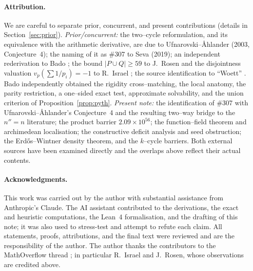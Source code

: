 \documentclass[11pt]{article}
\theoremstyle{definition}
\begin{document}
\paragraph{Attribution.}
We are careful to separate prior, concurrent, and present contributions (details in
Section~\ref{sec:prior}). \emph{Prior/concurrent:} the two--cycle reformulation, and its
equivalence with the arithmetic derivative, are due to Ufnarovski--\AA hlander
\cite{UfnarovskiAhlander2003} (2003, Conjecture~4); the naming of it as \#307 to Seva
\cite{Seva323194} (2019); an independent rederivation to Bado \cite{Bado2026}; the bound $|P\cup Q|\ge59$ to
J.~Rosen and the disjointness valuation $v_p(\sum1/p_i)=-1$ to R.~Israel \cite{MO320838}; the source
identification to ``Woett'' \cite{MO320838}. Bado \cite{Bado2026} independently obtained the rigidity
cross--matching, the local anatomy, the parity restriction, a one--sided exact test, approximate
solvability, and the union criterion of Proposition~\ref{prop:pyth}. \emph{Present note:} the identification of \#307 with
Ufnarovski--\AA hlander's Conjecture~4 and the resulting two--way bridge to the $n''=n$ literature; the product barrier $2.09\times10^{56}$; the
function--field theorem and archimedean localisation; the constructive deficit analysis and seed
obstruction; the Erd\H{o}s--Wintner density theorem, and the $k$--cycle barriers. Both external
sources \cite{Seva323194,Bado2026} have been examined directly and the overlaps above reflect their
actual contents.

\paragraph{Acknowledgments.}
This work was carried out by the author with substantial assistance from Anthropic's Claude. The
AI assistant contributed to the derivations, the exact and heuristic computations, the Lean~4
formalisation, and the drafting of this note; it was also used to stress-test and attempt to
refute each claim. All statements, proofs, attributions, and the final text were reviewed and are
the responsibility of the author. The author thanks the contributors to the MathOverflow thread
\cite{MO320838}; in particular R.~Israel and J.~Rosen, whose observations are credited above.
\end{document}
